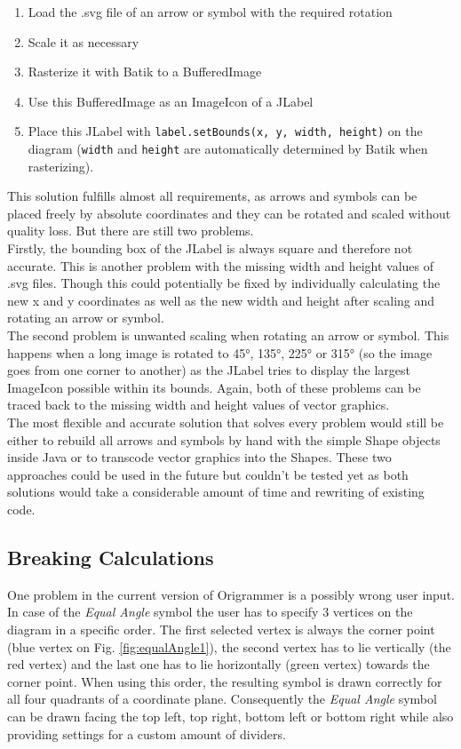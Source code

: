 \begin{enumerate}[label=\textbf{\arabic*}.]
	\item Load the .svg file of an arrow or symbol with the required rotation
	\item Scale it as necessary
	\item Rasterize it with Batik to a BufferedImage
	\item Use this BufferedImage as an ImageIcon of a JLabel
	\item Place this JLabel with \texttt{label.setBounds(x, y, width, height)}  on the diagram (\texttt{width} and \texttt{height} are automatically determined by Batik when rasterizing).
\end{enumerate}
This solution fulfills almost all requirements, as arrows and symbols can be placed freely by absolute coordinates and they can be rotated and scaled without quality loss. But there are still two problems.\\
Firstly, the bounding box of the JLabel is always square and therefore not accurate. This is another problem with the missing width and height values of .svg files. Though this could potentially be fixed by individually calculating the new x and y coordinates as well as the new width and height after scaling and rotating an arrow or symbol.\\
The second problem is unwanted scaling when rotating an arrow or symbol. This happens when a long image is rotated to 45°, 135°, 225° or 315° (so the image goes from one corner to another) as the JLabel tries to display the largest ImageIcon possible within its bounds. Again, both of these problems can be traced back to the missing width and height values of vector graphics.\\
The most flexible and accurate solution that solves every problem would still be either to rebuild all arrows and symbols by hand with the simple Shape objects inside Java or to transcode vector graphics into the Shapes. These two approaches could be used in the future but couldn't be tested yet as both solutions would take a considerable amount of time and rewriting of existing code.

\subsection{Breaking Calculations}
\label{sec:breakingCalc}
One problem in the current version of Origrammer is a possibly wrong user input. In case of the \emph{Equal Angle} symbol the user has to specify 3 vertices on the diagram in a specific order. The first selected vertex is always the corner point (blue vertex on Fig. \ref{fig:equalAngle1}), the second vertex has to lie vertically (the red vertex) and the last one has to lie horizontally (green vertex) towards the corner point. When using this order, the resulting symbol is drawn correctly for all four quadrants of a coordinate plane. Consequently the \emph{Equal Angle} symbol can be drawn facing the top left, top right, bottom left or bottom right while also providing settings for a custom amount of dividers.


